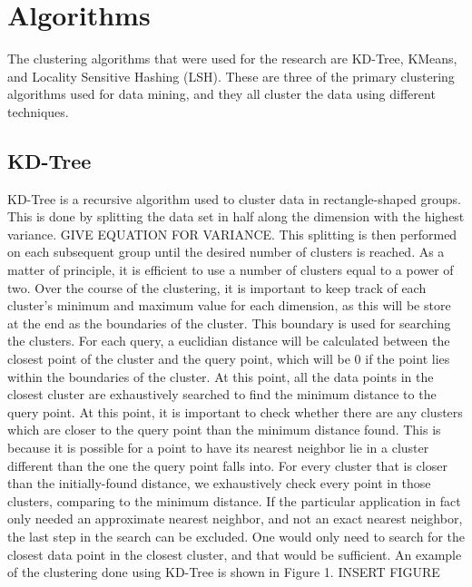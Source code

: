\documentclass[journal]{IEEEtran}
\begin{document}
\section{Algorithms}
The clustering algorithms that were used for the research are KD-Tree, KMeans, and Locality Sensitive Hashing (LSH). These are three of the primary clustering algorithms used for data mining, and they all cluster the data using different techniques.

\subsection{KD-Tree}
KD-Tree is a recursive algorithm used to cluster data in rectangle-shaped groups. This is done by splitting the data set in half along the dimension with the highest variance. GIVE EQUATION FOR VARIANCE. This splitting is then performed on each subsequent group until the desired number of clusters is reached. As a matter of principle, it is efficient to use a number of clusters equal to a power of two. Over the course of the clustering, it is important to keep track of each cluster's minimum and maximum value for each dimension, as this will be store at the end as the boundaries of the cluster. This boundary is used for searching the clusters. For each query, a euclidian distance will be calculated between the closest point of the cluster and the query point, which will be 0 if the point lies within the boundaries of the cluster. At this point, all the data points in the closest cluster are exhaustively searched to find the minimum distance to the query point. At this point, it is important to check whether there are any clusters which are closer to the query point than the minimum distance found. This is because it is possible for a point to have its nearest neighbor lie in a cluster different than the one the query point falls into. For every cluster that is closer than the initially-found distance, we exhaustively check every point in those clusters, comparing to the minimum distance. If the particular application in fact only needed an approximate nearest neighbor, and not an exact nearest neighbor, the last step in the search can be excluded. One would only need to search for the closest data point in the closest cluster, and that would be sufficient. An example of the clustering done using KD-Tree is shown in Figure 1. INSERT FIGURE
\end{document}
